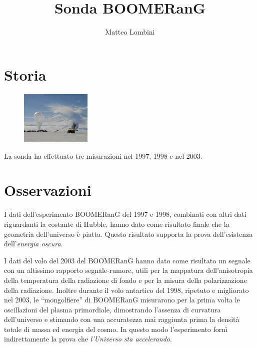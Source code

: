 \documentclass[12pt,a4paper]{article}
\begin{document}
\title{\vspace{-70pt}Sonda BOOMERanG}
\author{Matteo Lombini}
\date{}
\maketitle
\pagestyle{empty}
\thispagestyle{empty}

\section*{Storia}
\label{storia}
\begin{figure}
  \vspace{-10pt}
  \begin{center}
    \includegraphics[width=0.30\textwidth]{satellite}
  \end{center}
  \vspace{-20pt}
\end{figure}
La sonda ha effettuato tre misurazioni nel 1997, 1998 e nel 2003.

\section*{Osservazioni}
\label{osservazioni}

I dati dell'esperimento BOOMERanG del 1997 e 1998, combinati con altri dati riguardanti la costante di Hubble, hanno dato come risultato finale che la geometria dell'universo è piatta. Questo risultato supporta la prova dell'esistenza dell'\emph{energia oscura}. 

I dati del volo del 2003 del BOOMERanG hanno dato come risultato un segnale con un altissimo rapporto segnale-rumore, utili per la mappatura dell'anisotropia della temperatura della radiazione di fondo e per la misura della polarizzazione della radiazione. Inoltre durante il volo antartico del 1998, ripetuto e migliorato nel 2003, le “mongolfiere” di BOOMERanG misurarono per la prima volta le oscillazioni del plasma primordiale, dimostrando l'assenza di curvatura dell'universo e stimando con una accuratezza mai raggiunta prima la densità totale di massa ed energia del cosmo. In questo modo l’esperimento fornì indirettamente la prova che \emph{l’Universo sta accelerando}.
\end{document}
